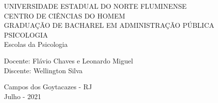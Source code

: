\begin{center}
    {\large UNIVERSIDADE ESTADUAL DO NORTE FLUMINENSE}
    \\[0.2cm]
    {\large CENTRO DE CIÊNCIAS DO HOMEM}
    \\[0.2cm]
    {\large GRADUAÇÃO DE BACHAREL EM ADMINISTRAÇÃO PÚBLICA}
    \\[0.2cm]
    {\large PSICOLOGIA}
    \\[8cm]
    { \huge Escolas da Psicologia}
    \\[4cm]
\end{center}

\begin{flushleft}
    Docente: Flávio Chaves e Leonardo Miguel\\[.2cm]
    Discente: Wellington Silva\\[4cm]
\end{flushleft}

\begin{center}
    {\large Campos dos Goytacazes - RJ}\\[0.2cm]
    {\large Julho - 2021}
\end{center}